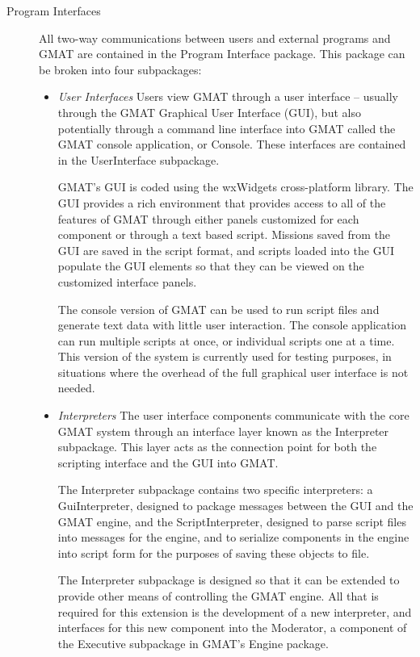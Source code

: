 \begin{description}
\item[Program Interfaces] All two-way communications between users and external
programs and GMAT are contained in the Program Interface package.  This package can be broken into
four subpackages:
  \begin{itemize}
    \item \textit{User Interfaces} Users view GMAT through a
user interface -- usually through the GMAT Graphical User Interface (GUI), but also potentially
through a command line interface into GMAT called the GMAT console application, or Console.  These
interfaces are contained in the UserInterface subpackage.

    GMAT's GUI is coded using the wxWidgets cross-platform library\cite{wxWidgets}. The GUI provides
a rich environment that provides access to all of the features of GMAT through either panels
customized for each component or through a text based script.  Missions saved from the GUI are saved
in the script format, and scripts loaded into the GUI populate the GUI elements so that they can be
viewed on the customized interface panels.

    The console version of GMAT can be used to run script files and generate text data with little
user interaction.  The console application can run multiple scripts at once, or individual scripts
one at a time.  This version of the system is currently used for testing purposes, in situations
where the overhead of the full graphical user interface is not needed.

    \item \textit{Interpreters} The user interface components
communicate with the core GMAT system through an interface layer known as the Interpreter
subpackage.  This layer acts as the connection point for both the scripting interface and the GUI
into GMAT.

    The Interpreter subpackage contains two specific interpreters: a GuiInterpreter, designed to
package messages between the GUI and the GMAT engine, and the ScriptInterpreter, designed to parse
script files into messages for the engine, and to serialize components in the engine into script
form for the purposes of saving these objects to file.

    The Interpreter subpackage is designed so that it can be extended to provide other means of
controlling the GMAT engine.  All that is required for this extension is the development of a new
interpreter, and interfaces for this new component into the Moderator, a component of the Executive
subpackage in GMAT's Engine package.


\end{itemize}
\end{description}
